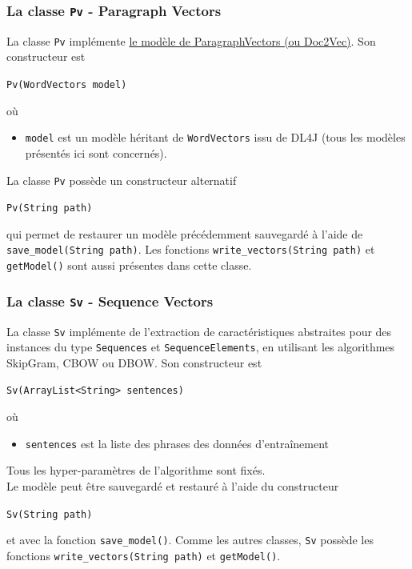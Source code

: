 \documentclass[10pt,a4paper]{article}
\newcommand\tab[1][0.5cm]{\hspace*{#1}}
\begin{document}
\subsubsection{La classe \texttt{Pv} - Paragraph Vectors}
La classe \texttt{Pv} implémente \href{https://cs.stanford.edu/~quocle/paragraph_vector.pdf}{le modèle de ParagraphVectors (ou Doc2Vec)}. Son constructeur est
\begin{center}
	\texttt{Pv(WordVectors model)}
\end{center}
où
\begin{itemize}
	\item \texttt{model} est un modèle héritant de \texttt{WordVectors} issu de DL4J (tous les modèles présentés ici sont concernés).
\end{itemize}
\tab La classe \texttt{Pv} possède un constructeur alternatif
\begin{center}
	\texttt{Pv(String path)}
\end{center}
qui permet de restaurer un modèle précédemment sauvegardé à l'aide de \texttt{save\_model(String path)}. Les fonctions \texttt{write\_vectors(String path)} et \texttt{getModel()} sont aussi présentes dans cette classe.

\subsubsection{La classe \texttt{Sv} - Sequence Vectors}
La classe \texttt{Sv} implémente de l'extraction de caractéristiques abstraites pour des instances du type \texttt{Sequences} et \texttt{SequenceElements}, en utilisant les algorithmes SkipGram, CBOW ou DBOW. Son constructeur est
\begin{center}
	\texttt{Sv(ArrayList<String> sentences)}
\end{center}
où
\begin{itemize}
	\item \texttt{sentences} est la liste des phrases des données d'entraînement
\end{itemize}
Tous les hyper-paramètres de l'algorithme sont fixés.\\
\tab Le modèle peut être sauvegardé et restauré à l'aide du constructeur
\begin{center}
	\texttt{Sv(String path)}
\end{center}
et avec la fonction \texttt{save\_model()}. Comme les autres classes, \texttt{Sv} possède les fonctions \texttt{write\_vectors(String path)} et \texttt{getModel()}.
\end{document}

